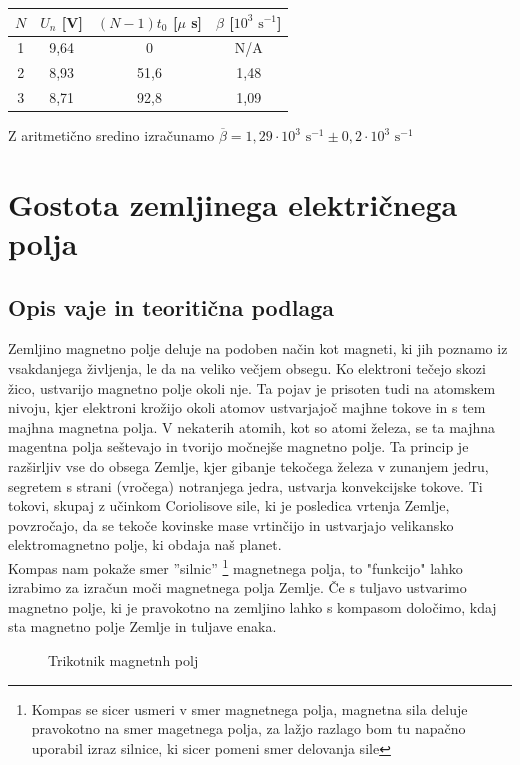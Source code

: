 \documentclass[12pt]{article}
\begin{document}
	\begin{table}[h!]
		\centering
		\begin{tabular}{|c|c|c|c|}
			\hline
			$N$ & $U_n$ [V] & $(N-1)t_0$ [$\mu$ s] & $\beta$ [$10^3 \text{ s}^{-1}$] \\ \hline
			1 & 9,64 & 0 & N/A \\ \hline
			2 & 8,93 & 51,6  & 1,48 \\ \hline
			3 & 8,71 & 92,8  & 1,09 \\ \hline
		\end{tabular}
	\end{table}

	Z aritmetično sredino izračunamo $\overline{\beta} = 1,29 \cdot 10^3 \text{ s}^{-1} \pm 0,2 \cdot 10^3 \text{ s}^{-1}$

\newpage
\section{Gostota zemljinega električnega polja}
	\subsection*{Opis vaje in teoritična podlaga}
	Zemljino magnetno polje deluje na podoben način kot magneti, ki jih poznamo iz vsakdanjega 
	življenja, le da na veliko večjem obsegu. Ko elektroni tečejo skozi žico, ustvarijo 
	magnetno polje okoli nje. Ta pojav je prisoten tudi na atomskem nivoju, kjer elektroni
	krožijo okoli atomov ustvarjajoč majhne tokove in s tem majhna magnetna polja. V
	nekaterih atomih, kot so atomi železa, se ta majhna magentna polja seštevajo in tvorijo
	močnejše magnetno polje. Ta princip je razširljiv vse do obsega Zemlje, kjer gibanje
	tekočega železa v zunanjem jedru, segretem s strani (vročega) notranjega jedra, ustvarja
	konvekcijske tokove. Ti tokovi, skupaj z učinkom Coriolisove sile, ki je posledica
	vrtenja Zemlje, povzročajo, da se tekoče kovinske mase vrtinčijo in ustvarjajo velikansko
	elektromagnetno polje, ki obdaja naš planet. \\

	Kompas nam pokaže smer ''silnic'' \footnote{Kompas se sicer usmeri v smer magnetnega polja,
	magnetna sila deluje pravokotno na smer magetnega polja, za lažjo razlago bom tu napačno
	uporabil izraz silnice, ki sicer pomeni smer delovanja sile} magnetnega polja, to "funkcijo"
	lahko izrabimo za izračun moči magnetnega polja Zemlje. Če s tuljavo ustvarimo magnetno
	polje, ki je pravokotno na zemljino lahko s kompasom določimo, kdaj sta magnetno polje
	Zemlje in tuljave enaka.
	\begin{figure}[h!]
		\centering
		\caption{Trikotnik magnetnh polj}
	\end{figure}
\end{document}

